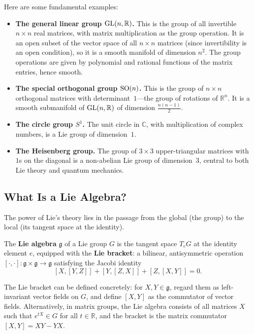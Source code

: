 Here are some fundamental examples:

\begin{itemize}
    \item \textbf{The general linear group $\operatorname{GL}(n,\mathbb{R})$.} This is the group of all invertible $n \times n$ real matrices, with matrix multiplication as the group operation. It is an open subset of the vector space of all $n \times n$ matrices (since invertibility is an open condition), so it is a smooth manifold of dimension $n^2$. The group operations are given by polynomial and rational functions of the matrix entries, hence smooth.

    \item \textbf{The special orthogonal group $\operatorname{SO}(n)$.} This is the group of $n \times n$ orthogonal matrices with determinant~$1$---the group of rotations of $\mathbb{R}^n$. It is a smooth submanifold of $\operatorname{GL}(n,\mathbb{R})$ of dimension $\tfrac{n(n-1)}{2}$.

    \item \textbf{The circle group $S^1$.} The unit circle in $\mathbb{C}$, with multiplication of complex numbers, is a Lie group of dimension~$1$.

    \item \textbf{The Heisenberg group.} The group of $3 \times 3$ upper-triangular matrices with $1$s on the diagonal is a non-abelian Lie group of dimension~$3$, central to both Lie theory and quantum mechanics.
\end{itemize}

\subsection{What Is a Lie Algebra?}

The power of Lie's theory lies in the passage from the global (the group) to the local (its tangent space at the identity).

\begin{definition}
The \textbf{Lie algebra} $\mathfrak{g}$ of a Lie group $G$ is the tangent space $T_e G$ at the identity element $e$, equipped with the \textbf{Lie bracket}: a bilinear, antisymmetric operation $[\cdot, \cdot] \colon \mathfrak{g} \times \mathfrak{g} \to \mathfrak{g}$ satisfying the Jacobi identity
\[
[X,[Y,Z]] + [Y,[Z,X]] + [Z,[X,Y]] = 0.
\]
\end{definition}

The Lie bracket can be defined concretely: for $X, Y \in \mathfrak{g}$, regard them as left-invariant vector fields on $G$, and define $[X,Y]$ as the commutator of vector fields. Alternatively, in matrix groups, the Lie algebra consists of all matrices $X$ such that $e^{tX} \in G$ for all $t \in \mathbb{R}$, and the bracket is the matrix commutator $[X,Y] = XY - YX$.

